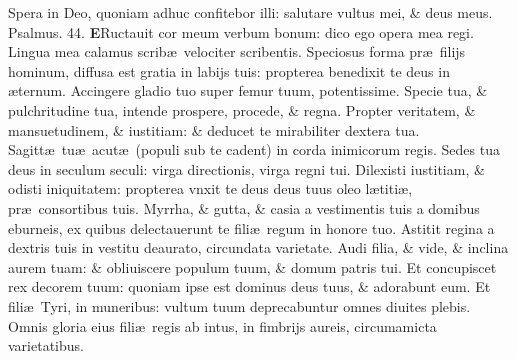 \documentclass[a5paper,10pt]{book}
\def\ae{æ}
\begin{document}
\begin{multicols*}{2}
\newline \color{red} S\color{black}pera in Deo, quoniam adhuc confitebor illi: salutare vultus mei, \& deus meus.\quad \color{red} Psalmus. \hypertarget{ps44}{44.} \color{black}
\vspace{-1em}
\lettrine[lines=2]{\bfseries \color{red} E}{}Ructauit cor meum verbum bonum: dico ego opera mea regi.
\newline \color{red} L\color{black}ingua mea calamus scrib\ae \ velociter scribentis.
\newline \color{red} S\color{black}peciosus forma pr\ae \ filijs hominum, diffusa est gratia in labijs tuis: propterea benedixit te deus in \ae ternum.
\newline \color{red} A\color{black}ccingere gladio tuo super femur tuum, potentissime.
\newline \color{red} S\color{black}pecie tua, \& pulchritudine tua, intende prospere, procede, \& regna.
\newline \color{red} P\color{black}ropter veritatem, \& mansuetudinem, \& iustitiam: \& deducet te mirabiliter dextera tua.
\newline \color{red} S\color{black}agitt\ae \ tu\ae \ acut\ae \ (populi sub te cadent) in corda inimicorum regis.
\newline \color{red} S\color{black}edes tua deus in seculum seculi: virga directionis, virga regni tui.
\newline \color{red} D\color{black}ilexisti iustitiam, \& odisti iniquitatem: propterea vnxit te deus deus tuus oleo l\ae titi\ae , pr\ae \ consortibus tuis.
\newline \color{red} M\color{black}yrrha, \& gutta, \& casia a vestimentis tuis a domibus eburneis, ex quibus delectauerunt te fili\ae \ regum in honore tuo.
\newline \color{red} A\color{black}stitit regina a dextris tuis in vestitu deaurato, circundata varietate.
\newline \color{red} A\color{black}udi filia, \& vide, \& inclina aurem tuam: \& obliuiscere populum tuum, \& domum patris tui.
\newline \color{red} E\color{black}t concupiscet rex decorem tuum: quoniam ipse est dominus deus tuus, \& adorabunt eum.
\newline \color{red} E\color{black}t fili\ae \ Tyri, in muneribus: vultum tuum deprecabuntur omnes diuites plebis.
\newline \color{red} O\color{black}mnis gloria eius fili\ae \ regis ab intus, in fimbrijs aureis, circumamicta varietatibus.

\end{multicols*}
\end{document}
